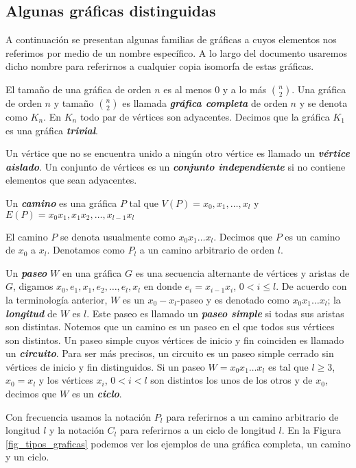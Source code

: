 \subsection{Algunas gráficas distinguidas}

A continuación se presentan algunas familias de gráficas a cuyos elementos nos referimos por medio de un nombre específico. A lo largo del documento usaremos dicho nombre para referirnos a cualquier copia isomorfa de estas gráficas.  
 
El tamaño de una gráfica de orden $n$ es al menos $0$ y a lo más $\binom{n}{2}$. Una gráfica de orden $n$ y tamaño $\binom{n}{2}$ es llamada \textbf{\emph{gráfica completa}} de orden $n$ y se denota como $K_n$. En $K_n$ todo par de vértices son adyacentes. Decimos que la gráfica $K_1$ es una gráfica \textbf{\emph{trivial}}.

Un vértice que no se encuentra unido a ningún otro vértice es llamado un \textbf{\emph{vértice aislado}}. Un conjunto de vértices es un \textbf{\emph{conjunto independiente}} si no contiene elementos que sean adyacentes.

Un \textbf{\emph{camino}} es una gráfica $P$ tal que  $V(P) = {x_0,x_1,\dots,x_l}$ y $E(P) = {x_0x_1,x_1x_2,\dots,x_{l-1}x_l}$

El camino $P$ se denota usualmente como $x_0x_1\dots x_l$. Decimos que $P$ es un camino de $x_0$ a $x_l$. Denotamos como $P_l$ a un camino arbitrario de orden $l$.

Un \textbf{\emph{paseo}} $W$ en una gráfica $G$ es una secuencia alternante de vértices y aristas de $G$, digamos $x_0, e_1, x_1, e_2, \dots, e_l, x_l$ en donde $e_i=x_{i-1}x_i$, $0<i\leq l$. De acuerdo con la terminología anterior, $W$ es un $x_0-x_l$-paseo y es denotado como $x_0x_1\dots x_l$; la \textbf{\emph{longitud}} de $W$ es $l$. Este paseo es llamado un  \textbf{\emph{paseo simple}} si todas sus aristas son distintas. Notemos que un camino es un paseo en el que todos sus vértices son distintos. Un paseo simple cuyos vértices de inicio y fin coinciden es llamado un \textbf{\emph{circuito}}. Para ser más precisos, un circuito es un paseo simple cerrado sin vértices de inicio y fin distinguidos. Si un paseo $W = x_0x_1\dots x_l$ es tal que $l\geq 3$, $x_0=x_l$ y los vértices $x_i$, $0<i<l$ son distintos los unos de los otros y de $x_0$, decimos que $W$ es un \textbf{\emph{ciclo}}. 

Con frecuencia usamos la notación $P_l$ para referirnos a un camino arbitrario de longitud $l$ y la notación $C_l$ para referirnos a un ciclo de longitud $l$. En la Figura \ref{fig_tipos_graficas} podemos ver los ejemplos de una gráfica completa, un camino y un ciclo.

